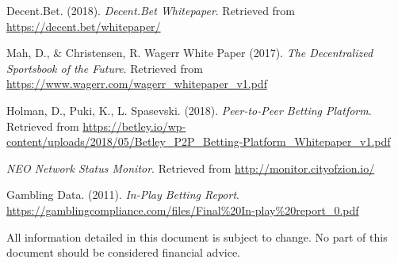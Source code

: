 \documentclass{article}
\begin{document}
\begin{thebibliography}{16}
	Decent.Bet. (2018).
	\textit{Decent.Bet Whitepaper}. 
	Retrieved from \url{https://decent.bet/whitepaper/}
	
	Mah, D., \& Christensen, R. Wagerr White Paper (2017). 
	\textit{The Decentralized Sportsbook of the Future}.
	Retrieved from \url{https://www.wagerr.com/wagerr\_whitepaper\_v1.pdf}

	Holman, D., Puki, K., L. Spasevski. (2018). 
	\textit{Peer-to-Peer Betting Platform}. 
	Retrieved from \url{https://betley.io/wp-content/uploads/2018/05/Betley\_P2P\_Betting-Platform\_Whitepaper\_v1.pdf}

	\textit{NEO Network Status Monitor}.
	Retrieved from \url{http://monitor.cityofzion.io/}
	
	Gambling Data. (2011).
	\textit{In-Play Betting Report}.
	\url{https://gamblingcompliance.com/files/Final\%20In-play\%20report\_0.pdf}
	
\newpage

All information detailed in this document is subject to change. No part of this document should be considered financial advice. 

\end{thebibliography}
\end{document}
